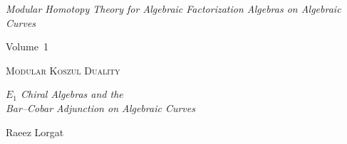 \documentclass[11pt]{memoir}
\begin{document}
\begin{titlingpage}
\vspace*{3cm}
\begin{center}

{\large\itshape Modular Homotopy Theory for Algebraic Factorization Algebras on Algebraic Curves}

\vspace{0.8cm}

{\normalsize Volume~1}

\vspace{1.5cm}

{\HUGE\scshape Modular Koszul Duality}

\vspace{1.5cm}

{\Large\itshape $E_1$ Chiral Algebras and the\\
Bar--Cobar Adjunction on Algebraic Curves}

\vspace{3cm}

{\large Raeez Lorgat}

\vspace{2cm}

\end{center}
\end{titlingpage}
\end{document}
